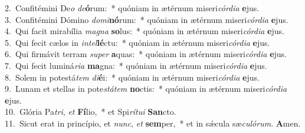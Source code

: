 {2.~}Confitémini De\textit{o} \textit{de}\textbf{ó}rum:~* quóniam in ætérnum miseri\textit{cór}\textit{di}\textit{a} \textbf{e}jus.\\
{3.~}Confitémini Dómino \textit{do}\textit{mi}\textbf{nó}rum:~* quóniam in ætérnum miseri\textit{cór}\textit{di}\textit{a} \textbf{e}jus.\\
{4.~}Qui facit mirabília \textit{ma}\textit{gna} \textbf{so}lus:~* quóniam in ætérnum miseri\textit{cór}\textit{di}\textit{a} \textbf{e}jus.\\
{5.~}Qui fecit cælos in \textit{in}\textit{tel}\textbf{lé}ctu:~* quóniam in ætérnum miseri\textit{cór}\textit{di}\textit{a} \textbf{e}jus.\\
{6.~}Qui firmávit terram \textit{su}\textit{per} \textbf{a}quas:~* quóniam in ætérnum miseri\textit{cór}\textit{di}\textit{a} \textbf{e}jus.\\
{7.~}Qui fecit luminá\textit{ri}\textit{a} \textbf{ma}gna:~* quóniam in ætérnum miseri\textit{cór}\textit{di}\textit{a} \textbf{e}jus.\\
{8.~}Solem in potestá\textit{tem} \textit{di}\textbf{é}i:~* quóniam in ætérnum miseri\textit{cór}\textit{di}\textit{a} \textbf{e}jus.\\
{9.~}Lunam et stellas in pote\textit{stá}\textit{tem} \textbf{no}ctis:~* quóniam in ætérnum miseri\textit{cór}\textit{di}\textit{a} \textbf{e}jus.\\
{10.~}Glória Pa\textit{tri}, \textit{et} \textbf{Fí}lio,~* et Spi\textit{rí}\textit{tu}\textit{i} \textbf{San}cto.\\
{11.~}Sicut erat in princípio, et \textit{nunc}, \textit{et} \textbf{sem}per,~* et in sǽcula sæ\textit{cu}\textit{ló}\textit{rum}. \textbf{A}men.\\
